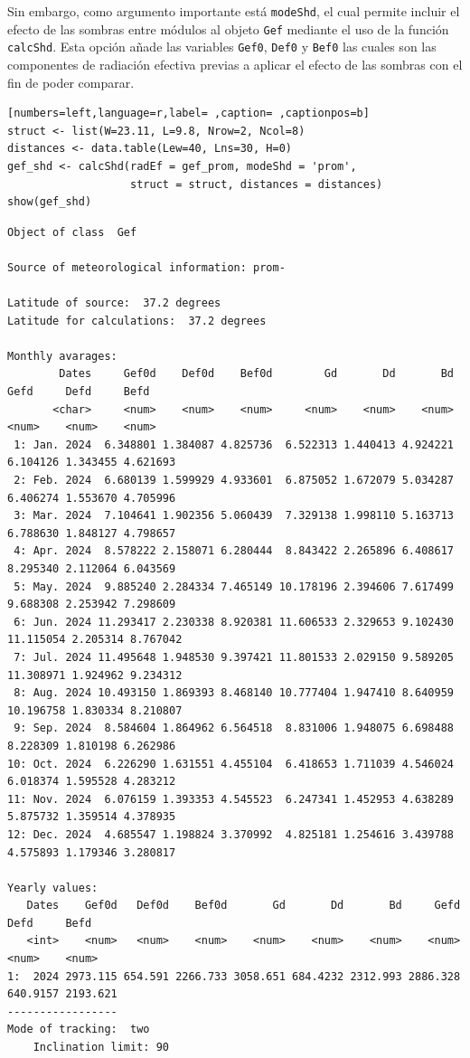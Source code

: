 Sin embargo, como argumento importante está \texttt{modeShd}, el cual permite incluir el efecto de las sombras entre módulos al objeto \texttt{Gef} mediante el uso de la función \texttt{calcShd}. Esta opción añade las variables \texttt{Gef0}, \texttt{Def0} y \texttt{Bef0} las cuales son las componentes de radiación efectiva previas a aplicar el efecto de las sombras con el fin de poder comparar.
\begin{lstlisting}[numbers=left,language=r,label= ,caption= ,captionpos=b]
struct <- list(W=23.11, L=9.8, Nrow=2, Ncol=8)
distances <- data.table(Lew=40, Lns=30, H=0)
gef_shd <- calcShd(radEf = gef_prom, modeShd = 'prom',
                   struct = struct, distances = distances)
show(gef_shd)
\end{lstlisting}

\begin{verbatim}
Object of class  Gef 

Source of meteorological information: prom- 

Latitude of source:  37.2 degrees
Latitude for calculations:  37.2 degrees

Monthly avarages:
        Dates     Gef0d    Def0d    Bef0d        Gd       Dd       Bd      Gefd     Defd     Befd
       <char>     <num>    <num>    <num>     <num>    <num>    <num>     <num>    <num>    <num>
 1: Jan. 2024  6.348801 1.384087 4.825736  6.522313 1.440413 4.924221  6.104126 1.343455 4.621693
 2: Feb. 2024  6.680139 1.599929 4.933601  6.875052 1.672079 5.034287  6.406274 1.553670 4.705996
 3: Mar. 2024  7.104641 1.902356 5.060439  7.329138 1.998110 5.163713  6.788630 1.848127 4.798657
 4: Apr. 2024  8.578222 2.158071 6.280444  8.843422 2.265896 6.408617  8.295340 2.112064 6.043569
 5: May. 2024  9.885240 2.284334 7.465149 10.178196 2.394606 7.617499  9.688308 2.253942 7.298609
 6: Jun. 2024 11.293417 2.230338 8.920381 11.606533 2.329653 9.102430 11.115054 2.205314 8.767042
 7: Jul. 2024 11.495648 1.948530 9.397421 11.801533 2.029150 9.589205 11.308971 1.924962 9.234312
 8: Aug. 2024 10.493150 1.869393 8.468140 10.777404 1.947410 8.640959 10.196758 1.830334 8.210807
 9: Sep. 2024  8.584604 1.864962 6.564518  8.831006 1.948075 6.698488  8.228309 1.810198 6.262986
10: Oct. 2024  6.226290 1.631551 4.455104  6.418653 1.711039 4.546024  6.018374 1.595528 4.283212
11: Nov. 2024  6.076159 1.393353 4.545523  6.247341 1.452953 4.638289  5.875732 1.359514 4.378935
12: Dec. 2024  4.685547 1.198824 3.370992  4.825181 1.254616 3.439788  4.575893 1.179346 3.280817

Yearly values:
   Dates    Gef0d   Def0d    Bef0d       Gd       Dd       Bd     Gefd     Defd     Befd
   <int>    <num>   <num>    <num>    <num>    <num>    <num>    <num>    <num>    <num>
1:  2024 2973.115 654.591 2266.733 3058.651 684.4232 2312.993 2886.328 640.9157 2193.621
-----------------
Mode of tracking:  two 
    Inclination limit: 90
\end{verbatim}

